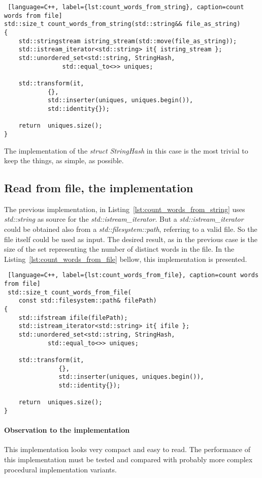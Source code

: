 \documentclass{article}
\begin{document}
\begin{lstlisting} [language=C++, label={lst:count_words_from_string}, caption=count words from file]
std::size_t count_words_from_string(std::string&& file_as_string)
{
    std::stringstream istring_stream(std::move(file_as_string));
    std::istream_iterator<std::string> it{ istring_stream };
    std::unordered_set<std::string, StringHash, 
    			std::equal_to<>> uniques;

    std::transform(it, 
    		{}, 
    		std::inserter(uniques, uniques.begin()), 
    		std::identity{});

    return  uniques.size();
}
\end{lstlisting}
The implementation of the \textit{struct StringHash} in this case is the most trivial to keep the things, as simple, as possible.

\subsection{Read from file, the implementation}

The previous implementation, in Listing~\ref{lst:count_words_from_string} uses \textit{std::string} as source for the \textit{std::istream\_iterator}. But a \textit{std::istream\_iterator} could be obtained also from a \textit{std::filesystem::path}, referring to a valid file. So the file itself could be used as input. The desired result, as in the previous case is the size of the set representing the  number of distinct words in the file. In the Listing~\ref{lst:count_words_from_file} bellow, this implementation is presented.

\begin{lstlisting} [language=C++, label={lst:count_words_from_file}, caption=count words from file]
 std::size_t count_words_from_file(
 	const std::filesystem::path& filePath)
{
    std::ifstream ifile(filePath);
    std::istream_iterator<std::string> it{ ifile };
    std::unordered_set<std::string, StringHash, 
    		std::equal_to<>> uniques;

    std::transform(it, 
    		   {},
    		   std::inserter(uniques, uniques.begin()), 
    		   std::identity{});

    return  uniques.size();
}
\end{lstlisting}

\paragraph{Observation to the implementation}
This implementation looks very compact and easy to read. The performance of this implementation must be tested and compared with probably more complex procedural implementation variants. 
\end{document}
